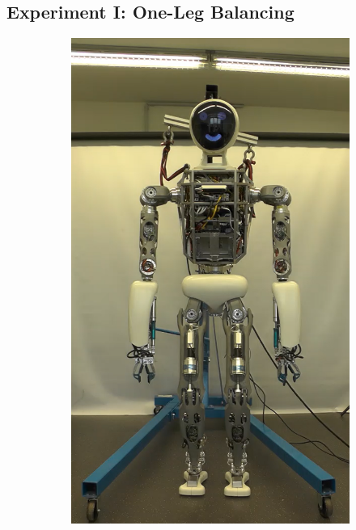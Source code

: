 \subsection{Experiment I: One-Leg Balancing}
\begin{figure}[h!]
\begin{subfigure}{.2\textwidth}
	\includegraphics[width=.95\linewidth]{experiments/balancing/1}
	\caption{}
	\end{subfigure}%
\begin{subfigure}{.2\textwidth}

\end{subfigure}
\end{figure}
